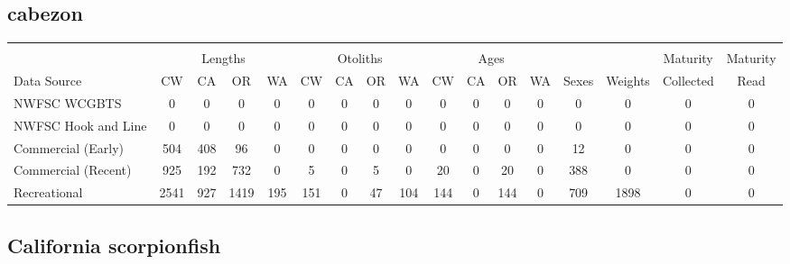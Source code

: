 \documentclass[12pt,]{article}
\begin{document}
\FloatBarrier  

\subsection{cabezon}\label{cabezon}

\begin{table}[ht]
\centering
\begingroup\fontsize{10pt}{10pt}\selectfont
\begin{tabular}{|l|cccc|cccc|cccc|c|c|c|c|}
  \hline
 &  &  &  &  &  &  &  &  &  &  &  &  &  &  &  &  \\ 
   & \multicolumn{4}{c}{Lengths} &  \multicolumn{4}{c}{Otoliths} & \multicolumn{4}{c}{Ages} &  & & Maturity & Maturity\\
 Data Source & CW & CA & OR & WA & CW & CA & OR & WA & CW & CA & OR & WA & Sexes & Weights & Collected & Read\\
 \hline
NWFSC WCGBTS & 0 & 0 & 0 & 0 & 0 & 0 & 0 & 0 & 0 & 0 & 0 & 0 & 0 & 0 & 0 & 0 \\ 
  NWFSC Hook and Line & 0 & 0 & 0 & 0 & 0 & 0 & 0 & 0 & 0 & 0 & 0 & 0 & 0 & 0 & 0 & 0 \\ 
  Commercial (Early) & 504 & 408 & 96 & 0 & 0 & 0 & 0 & 0 & 0 & 0 & 0 & 0 & 12 & 0 & 0 & 0 \\ 
  Commercial (Recent) & 925 & 192 & 732 & 0 & 5 & 0 & 5 & 0 & 20 & 0 & 20 & 0 & 388 & 0 & 0 & 0 \\ 
  Recreational & 2541 & 927 & 1419 & 195 & 151 & 0 & 47 & 104 & 144 & 0 & 144 & 0 & 709 & 1898 & 0 & 0 \\ 
   \hline
\end{tabular}
\endgroup
\end{table}

\FloatBarrier  

\subsection{California scorpionfish}\label{california-scorpionfish}
\end{document}

